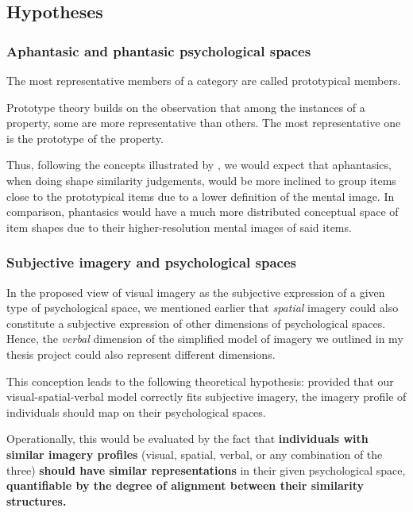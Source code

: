 \documentclass[
  authoryear]{elsarticle}
\begin{document}
\subsection{Hypotheses}\label{hypotheses}

\subsubsection{Aphantasic and phantasic psychological
spaces}\label{aphantasic-and-phantasic-psychological-spaces}

The most representative members of a category are called prototypical
members.

Prototype theory builds on the observation that among the instances of a
property, some are more representative than others. The most
representative one is the prototype of the property.

Thus, following the concepts illustrated by
\citet{gardenforsConceptualSpacesFramework2004}, we would expect that
aphantasics, when doing shape similarity judgements, would be more
inclined to group items close to the prototypical items due to a lower
definition of the mental image. In comparison, phantasics would have a
much more distributed conceptual space of item shapes due to their
higher-resolution mental images of said items.

\subsubsection{Subjective imagery and psychological
spaces}\label{subjective-imagery-and-psychological-spaces}

In the proposed view of visual imagery as the subjective expression of a
given type of psychological space, we mentioned earlier that
\emph{spatial} imagery could also constitute a subjective expression of
other dimensions of psychological spaces. Hence, the \emph{verbal}
dimension of the simplified model of imagery we outlined in my thesis
project could also represent different dimensions.

This conception leads to the following theoretical hypothesis: provided
that our visual-spatial-verbal model correctly fits subjective imagery,
the imagery profile of individuals should map on their psychological
spaces.

Operationally, this would be evaluated by the fact that
\textbf{individuals with similar imagery profiles} (visual, spatial,
verbal, or any combination of the three) \textbf{should have similar
representations} in their given psychological space,
\textbf{quantifiable by the degree of alignment between their similarity
structures.}
\end{document}

